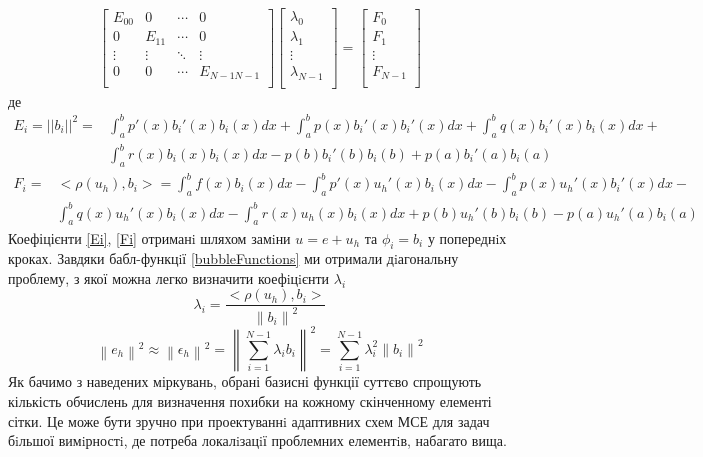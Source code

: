\documentclass[a4paper]{article}
\newcommand\norm[1]{\left\lVert#1\right\rVert}
\numberwithin{equation}{section}
\begin{document}
\begin{eqnarray}
\begin{bmatrix}
E_{00} & 0 & \cdots & 0 \\
0 & E_{11} & \cdots & 0 \\
\vdots & \vdots & \ddots & \vdots \\
0 & 0 & \cdots & E_{N-1N-1} \\
\end{bmatrix}
\begin{bmatrix}
\lambda_0 \\
\lambda_1 \\
\vdots \\
\lambda_{N-1} \\
\end{bmatrix}
=
\begin{bmatrix}
F_0 \\
F_1 \\
\vdots \\
F_{N-1} \\
\end{bmatrix}
\end{eqnarray}
де
\begin{equation}\label{Ei}
\begin{split}
E_i = ||b_i||^2 = & \int_a^b p'(x)b_i'(x)b_i(x)dx + \int_a^b p(x)b_i'(x)b_i'(x)dx + \int_a^b q(x)b_i'(x)b_i(x)dx + \\ & \int_a^b r(x)b_i(x)b_i(x)dx - p(b)b_i'(b)b_i(b) + p(a)b_i'(a)b_i(a)
\end{split}
\end{equation}
\begin{equation}\label{Fi}
\begin{split}
F_i=& <\rho(u_h),b_i>=\int_a^b f(x)b_i(x)dx-\int_a^b p'(x)u_h'(x)b_i(x)dx - \int_a^b p(x)u_h'(x)b_i'(x)dx - \\ & \int_a^b q(x)u_h'(x)b_i(x)dx - \int_a^b r(x)u_h(x)b_i(x)dx + p(b)u_h'(b)b_i(b) - p(a)u_h'(a)b_i(a)
\end{split}
\end{equation}
Коефіцієнти \ref{Ei}, \ref{Fi} отриманi шляхом замiни $u = e + u_h$ та $\phi_i = b_i$ у попереднiх кроках. Завдяки бабл-функцiї \ref{bubbleFunctions} ми отримали дiагональну проблему, з якої можна легко визначити коефiцiєнти $\lambda_i$
\begin{equation}
\lambda_i = \frac{<\rho(u_h), b_i>}{\norm{b_i}^2}
\end{equation}
\begin{equation}
\norm{e_h}^2\approx\norm{\epsilon_h}^2=\norm{\sum_{i=1}^{N-1}\lambda_ib_i}^2 = \sum_{i=1}^{N-1}\lambda_i^2\norm{b_i}^2
\end{equation}
Як бачимо з наведених міркувань, обрані базисні функції суттєво спрощують кількість обчислень для визначення похибки на кожному скінченному елементі сітки. Це може бути зручно при проектуваннi адаптивних схем МСЕ для задач бiльшої вимiрностi, де потреба локалiзацiї проблем\-них елементiв, набагато вища.
\end{document}
